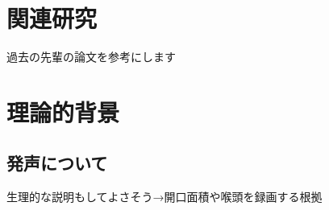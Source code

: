 \documentclass[10ptj,a4j,dvipdfmx,uplatex, draft]{jsbook}%
\begin{document}

\chapter{関連研究}
過去の先輩の論文を参考にします


\chapter{理論的背景}
\section{発声について}
生理的な説明もしてよさそう→開口面積や喉頭を録画する根拠
\end{document}
